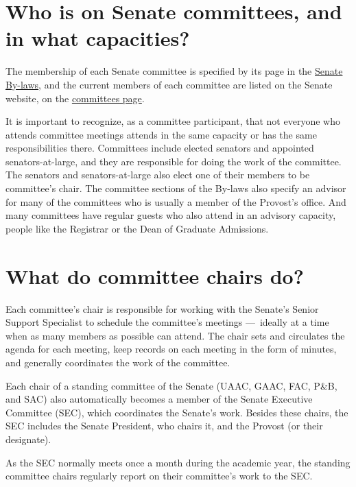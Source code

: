 \documentclass[12pt]{article}
\begin{document}
\section{Who is on Senate committees, and in what
capacities?}\label{who-is-on-senate-committees-and-in-what-capacities}

The membership of each Senate committee is specified by its page in the
\href{https://www.hofstra.edu/sites/default/files/2022-04/senatebylaws.pdf}{Senate
By-laws}, and the current members of each committee are listed on the
Senate website, on the
\href{https://www.hofstra.edu/senate/committees-subcommittees.html}{committees
page}.

It is important to recognize, as a committee participant, that not
everyone who attends committee meetings attends in the same capacity or
has the same responsibilities there. Committees include elected senators
and appointed senators-at-large, and they are responsible for doing the
work of the committee. The senators and senators-at-large also elect one
of their members to be committee's chair. The committee sections of the
By-laws also specify an advisor for many of the committees who is
usually a member of the Provost's office. And many committees have
regular guests who also attend in an advisory capacity, people like the
Registrar or the Dean of Graduate Admissions.

\section{What do committee chairs
do?}\label{what-do-committee-chairs-do}

Each committee's chair is responsible for working with the Senate's
Senior Support Specialist to schedule the committee's meetings
---~ideally at a time when as many members as possible can attend. The
chair sets and circulates the agenda for each meeting, keep records on
each meeting in the form of minutes, and generally coordinates the work
of the committee.

Each chair of a standing committee of the Senate (UAAC, GAAC, FAC, P\&B,
and SAC) also automatically becomes a member of the Senate Executive
Committee (SEC), which coordinates the Senate's work. Besides these
chairs, the SEC includes the Senate President, who chairs it, and the
Provost (or their designate).

As the SEC normally meets once a month during the academic year, the
standing committee chairs regularly report on their committee's work to
the SEC.
\end{document}
